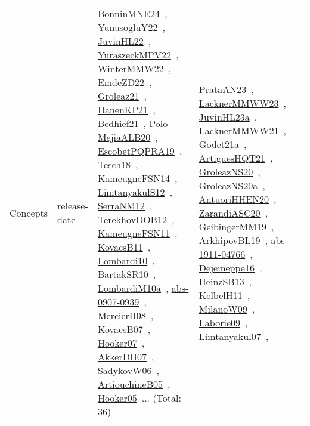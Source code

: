{\begin{longtable}{lp{3cm}>{\raggedright\arraybackslash}p{6cm}>{\raggedright\arraybackslash}p{6cm}>{\raggedright\arraybackslash}p{8cm}}
Concepts & release-date & \href{../works/BonninMNE24.pdf}{BonninMNE24}~\cite{BonninMNE24}, \href{../works/YunusogluY22.pdf}{YunusogluY22}~\cite{YunusogluY22}, \href{../works/JuvinHL22.pdf}{JuvinHL22}~\cite{JuvinHL22}, \href{../works/YuraszeckMPV22.pdf}{YuraszeckMPV22}~\cite{YuraszeckMPV22}, \href{../works/WinterMMW22.pdf}{WinterMMW22}~\cite{WinterMMW22}, \href{../works/EmdeZD22.pdf}{EmdeZD22}~\cite{EmdeZD22}, \href{../works/Groleaz21.pdf}{Groleaz21}~\cite{Groleaz21}, \href{../works/HanenKP21.pdf}{HanenKP21}~\cite{HanenKP21}, \href{../works/Bedhief21.pdf}{Bedhief21}~\cite{Bedhief21}, \href{../works/Polo-MejiaALB20.pdf}{Polo-MejiaALB20}~\cite{Polo-MejiaALB20}, \href{../works/EscobetPQPRA19.pdf}{EscobetPQPRA19}~\cite{EscobetPQPRA19}, \href{../works/Tesch18.pdf}{Tesch18}~\cite{Tesch18}, \href{../works/KameugneFSN14.pdf}{KameugneFSN14}~\cite{KameugneFSN14}, \href{../works/LimtanyakulS12.pdf}{LimtanyakulS12}~\cite{LimtanyakulS12}, \href{../works/SerraNM12.pdf}{SerraNM12}~\cite{SerraNM12}, \href{../works/TerekhovDOB12.pdf}{TerekhovDOB12}~\cite{TerekhovDOB12}, \href{../works/KameugneFSN11.pdf}{KameugneFSN11}~\cite{KameugneFSN11}, \href{../works/KovacsB11.pdf}{KovacsB11}~\cite{KovacsB11}, \href{../works/Lombardi10.pdf}{Lombardi10}~\cite{Lombardi10}, \href{../works/BartakSR10.pdf}{BartakSR10}~\cite{BartakSR10}, \href{../works/LombardiM10a.pdf}{LombardiM10a}~\cite{LombardiM10a}, \href{../works/abs-0907-0939.pdf}{abs-0907-0939}~\cite{abs-0907-0939}, \href{../works/MercierH08.pdf}{MercierH08}~\cite{MercierH08}, \href{../works/KovacsB07.pdf}{KovacsB07}~\cite{KovacsB07}, \href{../works/Hooker07.pdf}{Hooker07}~\cite{Hooker07}, \href{../works/AkkerDH07.pdf}{AkkerDH07}~\cite{AkkerDH07}, \href{../works/SadykovW06.pdf}{SadykovW06}~\cite{SadykovW06}, \href{../works/ArtiouchineB05.pdf}{ArtiouchineB05}~\cite{ArtiouchineB05}, \href{../works/Hooker05.pdf}{Hooker05}~\cite{Hooker05}... (Total: 36) & \href{../works/PrataAN23.pdf}{PrataAN23}~\cite{PrataAN23}, \href{../works/LacknerMMWW23.pdf}{LacknerMMWW23}~\cite{LacknerMMWW23}, \href{../works/JuvinHL23a.pdf}{JuvinHL23a}~\cite{JuvinHL23a}, \href{../works/LacknerMMWW21.pdf}{LacknerMMWW21}~\cite{LacknerMMWW21}, \href{../works/Godet21a.pdf}{Godet21a}~\cite{Godet21a}, \href{../works/ArtiguesHQT21.pdf}{ArtiguesHQT21}~\cite{ArtiguesHQT21}, \href{../works/GroleazNS20.pdf}{GroleazNS20}~\cite{GroleazNS20}, \href{../works/GroleazNS20a.pdf}{GroleazNS20a}~\cite{GroleazNS20a}, \href{../works/AntuoriHHEN20.pdf}{AntuoriHHEN20}~\cite{AntuoriHHEN20}, \href{../works/ZarandiASC20.pdf}{ZarandiASC20}~\cite{ZarandiASC20}, \href{../works/GeibingerMM19.pdf}{GeibingerMM19}~\cite{GeibingerMM19}, \href{../works/ArkhipovBL19.pdf}{ArkhipovBL19}~\cite{ArkhipovBL19}, \href{../works/abs-1911-04766.pdf}{abs-1911-04766}~\cite{abs-1911-04766}, \href{../works/Dejemeppe16.pdf}{Dejemeppe16}~\cite{Dejemeppe16}, \href{../works/HeinzSB13.pdf}{HeinzSB13}~\cite{HeinzSB13}, \href{../works/KelbelH11.pdf}{KelbelH11}~\cite{KelbelH11}, \href{../works/MilanoW09.pdf}{MilanoW09}~\cite{MilanoW09}, \href{../works/Laborie09.pdf}{Laborie09}~\cite{Laborie09}, \href{../works/Limtanyakul07.pdf}{Limtanyakul07}~\cite{Limtanyakul07}, 
\end{longtable}}
